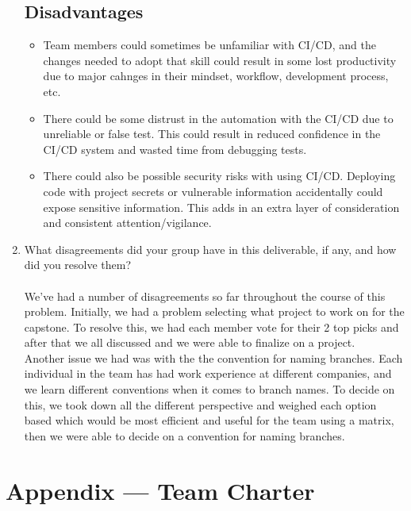 \documentclass{article}
\begin{document}
\begin{enumerate}
	\subsection*{Disadvantages}
	\begin{itemize}
		\item Team members could sometimes be unfamiliar with CI/CD, and the changes needed to 
		adopt that skill could result in some lost productivity due to major cahnges in their
		mindset, workflow, development process, etc.
		\item There could be some distrust in the automation with the CI/CD due to unreliable
		or false test. This could result in reduced confidence in the CI/CD system and wasted time
		from debugging tests.
		\item There could also be possible security risks with using CI/CD. Deploying code with 
		project secrets or vulnerable information accidentally could expose sensitive information.
		This adds in an extra layer of consideration and consistent attention/vigilance.
	\end{itemize}
    \item What disagreements did your group have in this deliverable, if any,
    and how did you resolve them?
	\paragraph*{}
	We've had a number of disagreements so far throughout the course of this problem. Initially,
	we had a problem selecting what project to work on for the capstone. To resolve this, we had
	each member vote for their 2 top picks and after that we all discussed and we were able to
	finalize on a project.\\
	Another issue we had was with the the convention for naming branches. Each individual in the team
	has had work experience at different companies, and we learn different conventions when it comes
	to branch names. To decide on this, we took down all the different perspective and weighed each option
	based which would be most efficient and useful for the team using a matrix, then we were able
	to decide on a convention for naming branches.
\end{enumerate}

\newpage{}

\section*{Appendix --- Team Charter}
\end{document}
